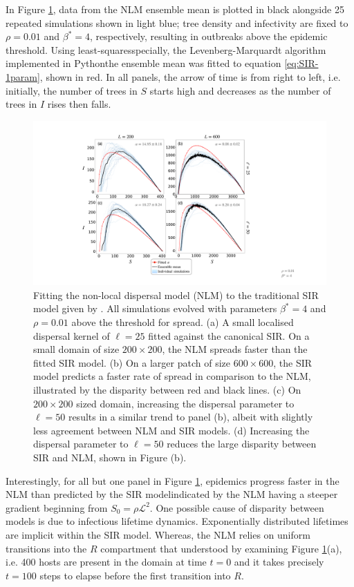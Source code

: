 In Figure \ref{fig:SIR-fitting}, data from the NLM ensemble mean is plotted in black alongside 25 repeated simulations shown in light blue; 
tree density and infectivity are fixed to $\rho=0.01$ and $\beta^*=4$, respectively, resulting in outbreaks above the epidemic threshold.
Using least-squares\textemdash specially, the Levenberg-Marquardt algorithm \cite{more1978levenberg} implemented in Python\textemdash the ensemble mean was fitted to equation \ref{eq:SIR-1param}, shown in red.
In all panels, the arrow of time is from right to left, i.e. initially, the number of trees in $S$ starts high and decreases as the number of trees in $I$ rises then falls.
 
 \begin{figure}
    \centering
    \includegraphics[scale=0.425]{chapter5/figures/fig2-sir-fitting-step.pdf}
    \caption{Fitting the non-local dispersal model (NLM) to the traditional SIR model given by \cite{kermack-model}. All simulations evolved with parameters $\beta^{*}=4$ and $\rho=0.01$ above the threshold for spread. (a) A small localised dispersal kernel of $\ell=25$ fitted against the canonical SIR. On a small domain of size $200\times 200$, the NLM spreads faster than the fitted SIR model. (b) On a larger patch of size $600\times 600$, the SIR model predicts a faster rate of spread in comparison to the NLM, illustrated by the disparity between red and black lines. (c) On $200\times 200$ sized domain, increasing the dispersal parameter to $\ell=50$ results in a similar trend to panel (b), albeit with slightly less agreement between NLM and SIR models. (d) Increasing the dispersal parameter to $\ell=50$ reduces the large disparity between SIR and NLM, shown in Figure (b).}
    \label{fig:SIR-fitting}
\end{figure}

Interestingly, for all but one panel in Figure \ref{fig:SIR-fitting}, epidemics progress faster in the NLM than predicted by the SIR model\textemdash indicated by the NLM having a steeper gradient beginning from $S_0=\rho\mathcal{L}^2$. 
One possible cause of disparity between models is due to infectious lifetime dynamics. 
Exponentially distributed lifetimes are implicit within the SIR model.
Whereas, the NLM relies on uniform transitions into the $R$ compartment that understood by examining Figure \ref{fig:SIR-fitting}(a), i.e. 400 hosts are present in the domain at time $t=0$ and it takes precisely $t=100$ steps to elapse before the first transition into $R$.

